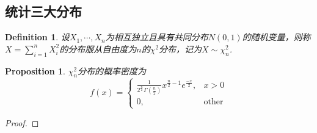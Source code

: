 \documentclass{article}
\newtheorem{proposition}[theorem]{Proposition}
\newtheorem{definition}[theorem]{Definition}
\begin{document}
\subsection{统计三大分布}

\begin{definition}
\rm 设$X_1,\cdots,X_n$为相互独立且具有共同分布$N(0,1)$的随机变量，则称$X=\sum\limits_{i=1}^n X_i^2$的分布服从自由度为$n$的$\chi ^2$分布，记为$X \sim \chi_n^2$.
\end{definition}

\begin{proposition}
\rm $\chi_n^2$分布的概率密度为
$$
f(x) =  \left\{
\begin{array}{ll}
\frac{1}{2^\frac{n}{2}\Gamma(\frac{n}{2})} x^{\frac{n}{2}-1}e^{\frac{-x}{2}}, & x > 0 \\
0, & \text{other}
\end{array} \right. 
$$
\end{proposition}

\begin{proof}
\rm 
\end{proof}
\end{document}
